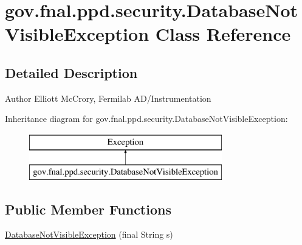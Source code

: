 \hypertarget{classgov_1_1fnal_1_1ppd_1_1security_1_1DatabaseNotVisibleException}{\section{gov.\-fnal.\-ppd.\-security.\-Database\-Not\-Visible\-Exception Class Reference}
\label{classgov_1_1fnal_1_1ppd_1_1security_1_1DatabaseNotVisibleException}
}


\subsection{Detailed Description}
\begin{DoxyAuthor}{Author}
Elliott Mc\-Crory, Fermilab A\-D/\-Instrumentation 
\end{DoxyAuthor}
Inheritance diagram for gov.\-fnal.\-ppd.\-security.\-Database\-Not\-Visible\-Exception\-:\begin{figure}[H]
\begin{center}
\leavevmode
\includegraphics[height=2.000000cm]{classgov_1_1fnal_1_1ppd_1_1security_1_1DatabaseNotVisibleException}
\end{center}
\end{figure}
\subsection*{Public Member Functions}
\begin{DoxyCompactItemize}
\item 
\hyperlink{classgov_1_1fnal_1_1ppd_1_1security_1_1DatabaseNotVisibleException_a32f650c9cc95fb8fe0951d92a68c8069}{Database\-Not\-Visible\-Exception} (final String s)
\end{DoxyCompactItemize}


